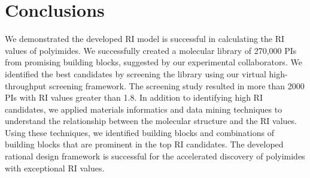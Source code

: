 \section{Conclusions}
\label{sec:conclusions5}

We demonstrated the developed RI model is successful in calculating the RI values of polyimides. We successfully created a molecular library of 270,000 PIs from promising building blocks, suggested by our experimental collaborators. We identified the best candidates by screening the library using our virtual high-throughput screening framework. The screening study resulted in more than 2000 PIs with RI values greater than 1.8. In addition to identifying high RI candidates, we applied materials informatics and data mining techniques to understand the relationship between the molecular structure and the RI values. Using these techniques, we identified building blocks and combinations of building blocks that are prominent in the top RI candidates. The developed rational design framework is successful for the accelerated discovery of polyimides with exceptional RI values.


